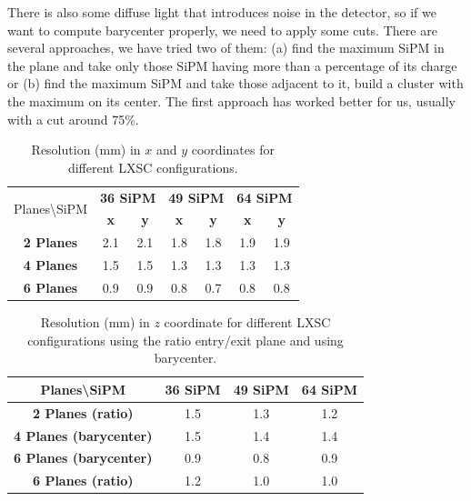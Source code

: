 There is also some diffuse light that introduces noise in the detector, so if we want to compute barycenter properly, we need to apply some cuts. There are several approaches, we have tried two of them: (a) find the maximum SiPM in the plane and take only those SiPM having more than a percentage of its charge or (b) find the maximum SiPM and take those adjacent to it, build a cluster with the maximum on its center. The first approach has worked better for us, usually with a cut around 75\%.


\begin{table}[h]
\caption{\label{tab.position} Resolution (mm) in $x$ and $y$ coordinates for different LXSC configurations.}
\begin{center}
 \begin{tabular}{c|cc|cc|cc}
  \toprule
\multirow{2}{*}{Planes\textbackslash SiPM}  & \multicolumn{2}{c}{\textbf{36 SiPM}} & \multicolumn{2}{c}{\textbf{49 SiPM}} & \multicolumn{2}{c}{\textbf{64 SiPM}} \\
  \cline{2-7}
  & \textbf{x} & \textbf{y} & \textbf{x} & \textbf{y} & \textbf{x} & \textbf{y} \\
  \hline
    \textbf{2 Planes} & 2.1 & 2.1 & 1.8 & 1.8 & 1.9 & 1.9 \\
    \textbf{4 Planes} & 1.5 & 1.5 & 1.3 & 1.3 & 1.3 & 1.3 \\
    \textbf{6 Planes} & 0.9 & 0.9 & 0.8 & 0.7 & 0.8 & 0.8 \\
    \toprule
 \end{tabular}
\end{center}
\end{table}

\begin{table}[h]
\caption{\label{tab.positionZ} Resolution (mm) in $z$ coordinate for different LXSC configurations using the ratio entry/exit plane and using barycenter.}
\begin{center}
 \begin{tabular}{c|ccc}
  \toprule
  Planes\textbackslash SiPM & \textbf{36 SiPM} & \textbf{49 SiPM} & \textbf{64 SiPM} \\
   \hline
  \textbf{2 Planes (ratio)} & 1.5 & 1.3 & 1.2 \\
  \textbf{4 Planes (barycenter)} & 1.5 & 1.4 & 1.4 \\
  \textbf{6 Planes (barycenter)} & 0.9 & 0.8 & 0.9 \\
  \textbf{6 Planes (ratio)} & 1.2 & 1.0 & 1.0 \\
    \toprule
 \end{tabular}
\end{center}
\end{table}


